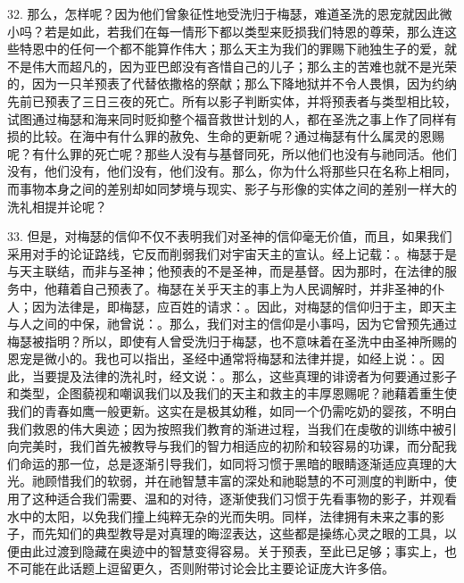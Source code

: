 32. 那么，怎样呢？因为他们曾象征性地受洗归于梅瑟，难道圣洗的恩宠就因此微小吗？若是如此，若我们在每一情形下都以类型来贬损我们特恩的尊荣，那么连这些特恩中的任何一个都不能算作伟大；那么天主为我们的罪赐下祂独生子的爱，就不是伟大而超凡的，因为亚巴郎没有吝惜自己的儿子；那么主的苦难也就不是光荣的，因为一只羊预表了代替依撒格的祭献；那么下降地狱并不令人畏惧，因为约纳先前已预表了三日三夜的死亡。所有以影子判断实体，并将预表者与类型相比较，试图通过梅瑟和海来同时贬抑整个福音救世计划的人，都在圣洗之事上作了同样有损的比较。在海中有什么罪的赦免、生命的更新呢？通过梅瑟有什么属灵的恩赐呢？有什么罪的死亡呢？那些人没有与基督同死，所以他们也没有与祂同活。他们没有，他们没有，他们没有，他们没有。那么，你为什么将那些只在名称上相同，而事物本身之间的差别却如同梦境与现实、影子与形像的实体之间的差别一样大的洗礼相提并论呢？\par

33. 但是，对梅瑟的信仰不仅不表明我们对圣神的信仰毫无价值，而且，如果我们采用对手的论证路线，它反而削弱我们对宇宙天主的宣认。经上记载：。梅瑟于是与天主联结，而非与圣神；他预表的不是圣神，而是基督。因为那时，在法律的服务中，他藉着自己预表了。梅瑟在关乎天主的事上为人民调解时，并非圣神的仆人；因为法律是，即梅瑟，应百姓的请求：。因此，对梅瑟的信仰归于主，即天主与人之间的中保，祂曾说：。那么，我们对主的信仰是小事吗，因为它曾预先通过梅瑟被指明？所以，即使有人曾受洗归于梅瑟，也不意味着在圣洗中由圣神所赐的恩宠是微小的。我也可以指出，圣经中通常将梅瑟和法律并提，如经上说：。因此，当要提及法律的洗礼时，经文说：。那么，这些真理的诽谤者为何要通过影子和类型，企图藐视和嘲讽我们以及我们的天主和救主的丰厚恩赐呢？祂藉着重生使我们的青春如鹰一般更新。这实在是极其幼稚，如同一个仍需吃奶的婴孩，不明白我们救恩的伟大奥迹；因为按照我们教育的渐进过程，当我们在虔敬的训练中被引向完美时，我们首先被教导与我们的智力相适应的初阶和较容易的功课，而分配我们命运的那一位，总是逐渐引导我们，如同将习惯于黑暗的眼睛逐渐适应真理的大光。祂顾惜我们的软弱，并在祂智慧丰富的深处和祂聪慧的不可测度的判断中，使用了这种适合我们需要、温和的对待，逐渐使我们习惯于先看事物的影子，并观看水中的太阳，以免我们撞上纯粹无杂的光而失明。同样，法律拥有未来之事的影子，而先知们的典型教导是对真理的晦涩表达，这些都是操练心灵之眼的工具，以便由此过渡到隐藏在奥迹中的智慧变得容易。关于预表，至此已足够；事实上，也不可能在此话题上逗留更久，否则附带讨论会比主要论证庞大许多倍。\par

